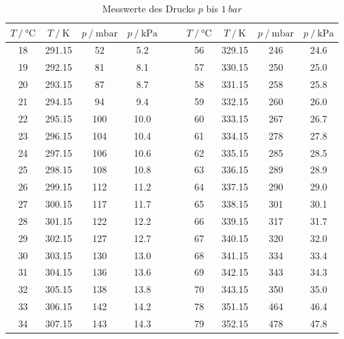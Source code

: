 \begin{table} [h!]
    \centering
    \caption{Messwerte des Drucks $p$ bis $\qty{1}{bar}$}
    \label{tab:daten1}
    \begin{tabular}{c c c c c c c c c}
        \toprule
        $T \mathbin{/} \unit{\celsius}$ & $T \mathbin{/} \unit{\kelvin}$ &  $p \mathbin{/} \unit{\milli\bar}$ & $p \mathbin{/} \unit{\kilo\pascal}$ & $\quad$ &
        $T \mathbin{/} \unit{\celsius}$ & $T \mathbin{/} \unit{\kelvin}$ &  $p \mathbin{/} \unit{\milli\bar}$ & $p \mathbin{/} \unit{\kilo\pascal}$ \\
        \midrule
        18 & 291.15 &    52 &    5.2 & $\quad$ &  56 & 329.15 &   246 &   24.6 \\
        19 & 292.15 &    81 &    8.1 & $\quad$ &  57 & 330.15 &   250 &   25.0 \\
        20 & 293.15 &    87 &    8.7 & $\quad$ &  58 & 331.15 &   258 &   25.8 \\
        21 & 294.15 &    94 &    9.4 & $\quad$ &  59 & 332.15 &   260 &   26.0 \\
        22 & 295.15 &   100 &   10.0 & $\quad$ &  60 & 333.15 &   267 &   26.7 \\
        23 & 296.15 &   104 &   10.4 & $\quad$ &  61 & 334.15 &   278 &   27.8 \\
        24 & 297.15 &   106 &   10.6 & $\quad$ &  62 & 335.15 &   285 &   28.5 \\
        25 & 298.15 &   108 &   10.8 & $\quad$ &  63 & 336.15 &   289 &   28.9 \\
        26 & 299.15 &   112 &   11.2 & $\quad$ &  64 & 337.15 &   290 &   29.0 \\
        27 & 300.15 &   117 &   11.7 & $\quad$ &  65 & 338.15 &   301 &   30.1 \\
        28 & 301.15 &   122 &   12.2 & $\quad$ &  66 & 339.15 &   317 &   31.7 \\
        29 & 302.15 &   127 &   12.7 & $\quad$ &  67 & 340.15 &   320 &   32.0 \\
        30 & 303.15 &   130 &   13.0 & $\quad$ &  68 & 341.15 &   334 &   33.4 \\
        31 & 304.15 &   136 &   13.6 & $\quad$ &  69 & 342.15 &   343 &   34.3 \\
        32 & 305.15 &   138 &   13.8 & $\quad$ &  70 & 343.15 &   350 &   35.0 \\
        33 & 306.15 &   142 &   14.2 & $\quad$ &  78 & 351.15 &   464 &   46.4 \\
        34 & 307.15 &   143 &   14.3 & $\quad$ &  79 & 352.15 &   478 &   47.8 \\

\end{tabular}
\end{table}
